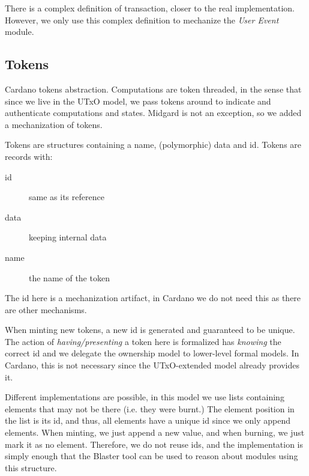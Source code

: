 There is a complex definition of transaction, closer to the real implementation.
%
However, we only use this complex definition to mechanize the \emph{User Event}
module.

\subsection{Tokens}

Cardano tokens abstraction.
%
Computations are token threaded, in the sense that since we live in the UTxO
model, we pass tokens around to indicate and authenticate computations and states.
%
Midgard is not an exception, so we added a mechanization of tokens.


\begin{definition}[Tokens]
  Tokens are structures containing a name, (polymorphic) data and id.
  \label{dfn:Tokens.Elem.TokenD}
  \leanok
  Tokens are records with:
  \begin{description}
    \item[id] same as its reference
    \item[data] keeping internal data
    \item[name] the name of the token
  \end{description}
  \end{definition}
%
The id here is a mechanization artifact, in Cardano we do not need this as there
are other mechanisms. 

When minting new tokens, a new id is generated and guaranteed to be unique.
%
The action of \emph{having/presenting} a token here is formalized has
\emph{knowing} the correct id and we delegate the ownership model to lower-level
formal models.
%
In Cardano, this is not necessary since the UTxO-extended model already provides it.

Different implementations are possible, in this model we use lists containing
elements that may not be there (i.e. they were burnt.)
%
The element position in the list is its id, and thus, all elements have a unique
id since we only append elements.
%
When minting, we just append a new value, and when burning, we just mark it as
no element.
%
Therefore, we do not reuse ids, and the implementation is simply enough that the
Blaster tool can be used to reason about modules using this structure.



